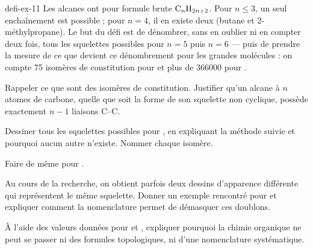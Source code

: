 \begin{blocEdition}{defi-ex-11}
Les alcanes ont pour formule brute $\ce{C_{$n$}H_{$2n+2$}}$. Pour $n\leq3$, un seul enchaînement est possible ; pour
$n=4$, il en existe deux (butane et 2-méthylpropane). Le but du défi est de dénombrer, sans en oublier ni en compter
deux fois, tous les squelettes possibles pour $n=5$ puis $n=6$ — puis de prendre la mesure de ce que devient ce
dénombrement pour les grandes molécules : on compte 75 isomères de constitution pour  et plus de
\num{366000} pour .
\begin{questions}
\item Rappeler ce que sont des isomères de constitution. Justifier qu'un alcane à $n$ atomes de carbone, quelle que
soit la forme de son squelette non cyclique, possède exactement $n-1$ liaisons C--C.
\item Dessiner tous les squelettes possibles pour , en expliquant la méthode suivie et pourquoi aucun autre
n'existe. Nommer chaque isomère.
\item Faire de même pour .
\item Au cours de la recherche, on obtient parfois deux dessins d'apparence différente qui représentent le même
squelette. Donner un exemple rencontré pour  et expliquer comment la nomenclature permet de démasquer ces
doublons.
\item À l'aide des valeurs données pour  et , expliquer pourquoi la chimie organique ne peut se
passer ni des formules topologiques, ni d'une nomenclature systématique.
\end{questions}
\end{blocEdition}

